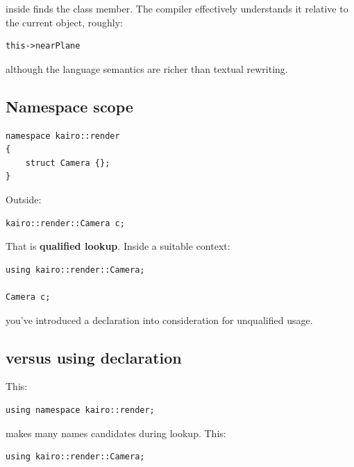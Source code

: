 inside  finds the class member. The compiler effectively understands it relative to the current object, roughly:

\begin{verbatim}
this->nearPlane
\end{verbatim}

although the language semantics are richer than textual rewriting.

\subsection{Namespace scope}\label{05-engine-i-ch002-namespace-scope}

\hypertarget{05-engine-i-ch002-namespace-scope}{}

\begin{verbatim}
namespace kairo::render
{
    struct Camera {};
}
\end{verbatim}

Outside:

\begin{verbatim}
kairo::render::Camera c;
\end{verbatim}

That is \textbf{qualified lookup}. Inside a suitable context:

\begin{verbatim}
using kairo::render::Camera;

Camera c;
\end{verbatim}

you've introduced a declaration into consideration for unqualified usage.

\subsection{\texorpdfstring{ versus using declaration}{usingnamespace versus using declaration}}\label{05-engine-i-ch002-using-namespace-versus-using-declaration}

\hypertarget{05-engine-i-ch002-using-namespace-versus-using-declaration}{}

This:

\begin{verbatim}
using namespace kairo::render;
\end{verbatim}

makes many names candidates during lookup. This:

\begin{verbatim}
using kairo::render::Camera;
\end{verbatim}

